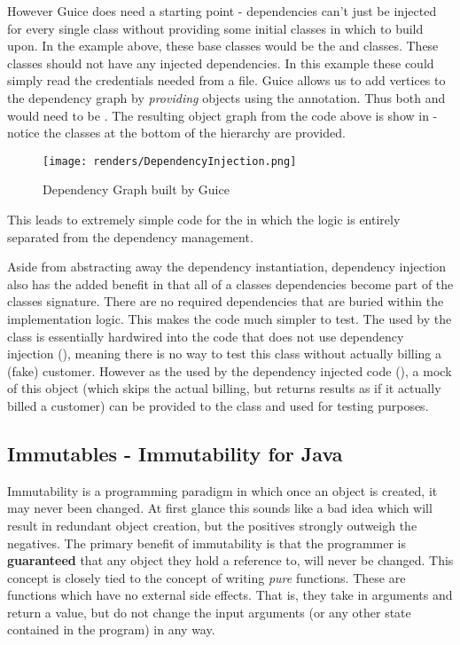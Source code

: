 However Guice does need a starting point - dependencies can't just be injected for every single class without providing some initial classes in which to build upon. In the example above, these base classes would be the  and  classes. These classes should not have any injected dependencies. In this example these could simply read the credentials needed from a file. Guice allows us to add vertices to the dependency graph by \textit{providing} objects using the  annotation. Thus both  and  would need to be . The resulting object graph from the code above is show in  - notice the classes at the bottom of the hierarchy are provided. 

\begin{figure}[H]
      \centering
      \texttt{[image: renders/DependencyInjection.png]}
      \caption{Dependency Graph built by Guice}
      \label{fig:depGraph}
\end{figure}

This leads to extremely simple code for the  in which the logic is entirely separated from the dependency management.



Aside from abstracting away the dependency instantiation, dependency injection also has the added benefit in that all of a classes dependencies become part of the classes signature. There are no required dependencies that are buried within the implementation logic. This makes the code much simpler to test. The  used by the class is essentially hardwired into the code that does not use dependency injection (), meaning there is no way to test this class without actually billing a (fake) customer. However as the  used by the dependency injected code (), a mock of this object (which skips the actual billing, but returns results as if it actually billed a customer) can be provided to the class and used for testing purposes.   

\subsection{Immutables - Immutability for Java}
Immutability is a programming paradigm in which once an object is created, it may never been changed. At first glance this sounds like a bad idea which will result in redundant object creation, but the positives strongly outweigh the negatives. The primary benefit of immutability is that the programmer is \textbf{guaranteed} that any object they hold a reference to, will never be changed. This concept is closely tied to the concept of writing \textit{pure} functions. These are functions which have no external side effects. That is, they take in arguments and return a value, but do not change the input arguments (or any other state contained in the program) in any way. 

